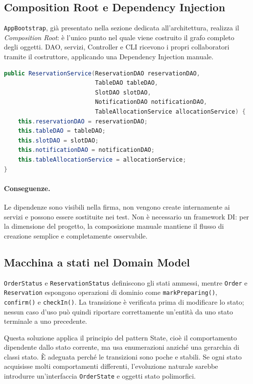 \documentclass[12pt,a4paper]{article}
\newcommand{\code}[1]{\nolinkurl{#1}}
\begin{document}
\subsection{Composition Root e Dependency Injection}

\code{AppBootstrap}, già presentato nella sezione dedicata all'architettura,
realizza il \emph{Composition Root}: è l'unico punto nel quale viene costruito il
grafo completo degli oggetti. DAO, servizi, Controller e CLI ricevono i propri
collaboratori tramite il costruttore, applicando una Dependency Injection
manuale.

\begin{lstlisting}[style=codeStyle,language=Java,
caption={Dipendenze dichiarate nel costruttore di ReservationService.}]
public ReservationService(ReservationDAO reservationDAO,
                          TableDAO tableDAO,
                          SlotDAO slotDAO,
                          NotificationDAO notificationDAO,
                          TableAllocationService allocationService) {
    this.reservationDAO = reservationDAO;
    this.tableDAO = tableDAO;
    this.slotDAO = slotDAO;
    this.notificationDAO = notificationDAO;
    this.tableAllocationService = allocationService;
}
\end{lstlisting}

\paragraph{Conseguenze.}
Le dipendenze sono visibili nella firma, non vengono create internamente ai
servizi e possono essere sostituite nei test. Non è necessario un framework DI:
per la dimensione del progetto, la composizione manuale mantiene il flusso di
creazione semplice e completamente osservabile.

\subsection{Macchina a stati nel Domain Model}

\code{OrderStatus} e \code{ReservationStatus} definiscono gli stati ammessi,
mentre \code{Order} e \code{Reservation} espongono operazioni di dominio come
\code{markPreparing()}, \code{confirm()} e \code{checkIn()}. La transizione è
verificata prima di modificare lo stato; nessun caso d'uso può quindi riportare
correttamente un'entità da uno stato terminale a uno precedente.

Questa soluzione applica il principio del pattern State, cioè il comportamento
dipendente dallo stato corrente, ma usa enumerazioni anziché una gerarchia di
classi stato. È adeguata perché le transizioni sono poche e stabili. Se ogni
stato acquisisse molti comportamenti differenti, l'evoluzione naturale sarebbe
introdurre un'interfaccia \code{OrderState} e oggetti stato polimorfici.
\end{document}

